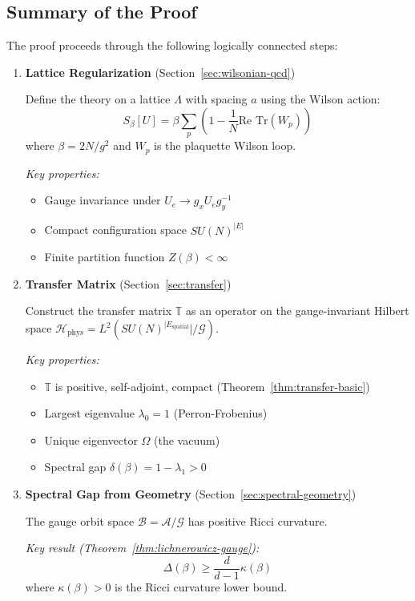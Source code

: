 \subsection{Summary of the Proof}

The proof proceeds through the following logically connected steps:

\begin{enumerate}[label=\textbf{Step \arabic*:}, leftmargin=*]

\item \textbf{Lattice Regularization} (Section~\ref{sec:wilsonian-qcd})

Define the theory on a lattice $\Lambda$ with spacing $a$ using the Wilson action:
\[
S_\beta[U] = \beta \sum_p \left(1 - \frac{1}{N}\text{Re Tr}(W_p)\right)
\]
where $\beta = 2N/g^2$ and $W_p$ is the plaquette Wilson loop.

\textit{Key properties:}
\begin{itemize}
\item Gauge invariance under $U_e \to g_x U_e g_y^{-1}$
\item Compact configuration space $SU(N)^{|E|}$
\item Finite partition function $Z(\beta) < \infty$
\end{itemize}

\item \textbf{Transfer Matrix} (Section~\ref{sec:transfer})

Construct the transfer matrix $\mathbb{T}$ as an operator on the gauge-invariant 
Hilbert space $\mathcal{H}_{\text{phys}} = L^2(SU(N)^{|E_{\text{spatial}}}|/\mathcal{G})$.

\textit{Key properties:}
\begin{itemize}
\item $\mathbb{T}$ is positive, self-adjoint, compact (Theorem~\ref{thm:transfer-basic})
\item Largest eigenvalue $\lambda_0 = 1$ (Perron-Frobenius)
\item Unique eigenvector $\Omega$ (the vacuum)
\item Spectral gap $\delta(\beta) = 1 - \lambda_1 > 0$
\end{itemize}

\item \textbf{Spectral Gap from Geometry} (Section~\ref{sec:spectral-geometry})

The gauge orbit space $\mathcal{B} = \mathcal{A}/\mathcal{G}$ has positive Ricci curvature.

\textit{Key result (Theorem~\ref{thm:lichnerowicz-gauge}):}
\[
\Delta(\beta) \geq \frac{d}{d-1} \kappa(\beta)
\]
where $\kappa(\beta) > 0$ is the Ricci curvature lower bound.


\end{enumerate}

